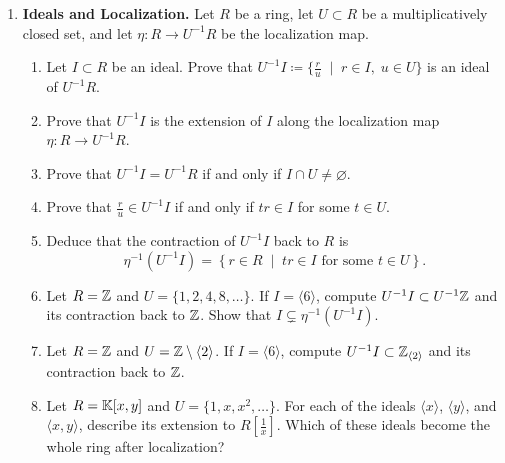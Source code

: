 \documentclass[12pt,reqno]{amsart}
\begin{document}
\begin{enumerate}[leftmargin=*,resume]

\item \textbf{Ideals and Localization.} Let $R$ be a ring, let $U\subset R$ be a multiplicatively closed set, and let $\eta:R\to U^{-1}R$ be the localization map.
\begin{enumerate}
	\item Let $I\subset R$ be an ideal. Prove that $U^{-1}I\coloneqq \{\frac{r}{u}\;\; |\;\; r\in I,\; u\in U\}$ is an ideal of $U^{-1}R$.
	\item Prove that $U^{-1}I$ is the extension of $I$ along the localization map $\eta:R\to U^{-1}R$.
	\item Prove that $U^{-1}I=U^{-1}R$ if and only if $I\cap U\neq \varnothing$.
	\item Prove that $\frac{r}{u}\in U^{-1}I$ if and only if $tr \in I$ for some $t \in U$. 
	\item Deduce that the contraction of $U^{-1}I$ back to $R$ is
	\[
	\eta^{-1}(U^{-1}I)=\left\{r\in R\;\; \big|\;\; tr\in I \text{ for some } t\in U\right\}.
	\]
	\item Let $R=\mathbb{Z}$ and $U=\{1,2,4,8,\ldots\}$. If $I=\langle 6\rangle$, compute $U^{-1}I\subset U^{-1}\mathbb{Z}$ and its contraction back to $\mathbb{Z}$. Show that $I\subsetneq \eta^{-1}(U^{-1}I)$.
	\item Let $R=\mathbb{Z}$ and $U=\mathbb{Z}\setminus \langle 2\rangle$. If $I=\langle 6\rangle$, compute  $U^{-1}I\subset \mathbb{Z}_{\langle 2\rangle}$ and its contraction back to $\mathbb{Z}$.
	\item Let $R=\mathbb{K}[x,y]$ and $U=\{1,x,x^2,\ldots\}$. For each of the ideals $\langle x\rangle$, $\langle y\rangle$, and $\langle x,y\rangle$, describe its extension to $R[\frac{1}{x}]$. Which of these ideals become the whole ring after localization?
\end{enumerate}


\end{enumerate}
\end{document}

